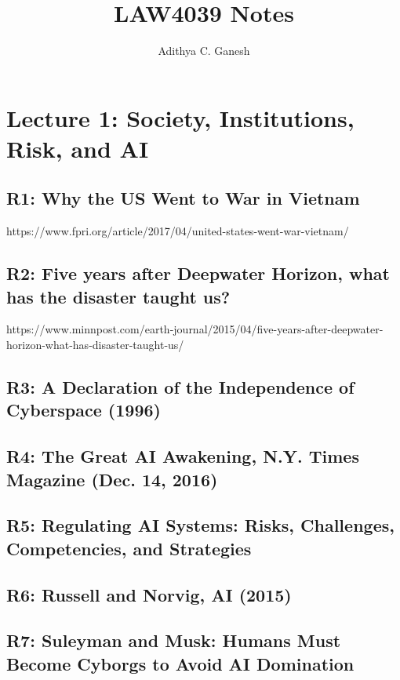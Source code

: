 \documentclass{article}
\title{LAW4039 Notes}
\author{Adithya C. Ganesh}
\begin{document}
\maketitle

\tableofcontents

\newpage

\section{Lecture 1: Society, Institutions, Risk, and AI}

\subsection{R1: Why the US Went to War in Vietnam}

https://www.fpri.org/article/2017/04/united-states-went-war-vietnam/

\subsection{R2: Five years after Deepwater Horizon, what has the disaster taught us?}

https://www.minnpost.com/earth-journal/2015/04/five-years-after-deepwater-horizon-what-has-disaster-taught-us/

\subsection{R3: A Declaration of the Independence of Cyberspace (1996)}

\subsection{R4: The Great AI Awakening, N.Y. Times Magazine (Dec. 14, 2016)}

\subsection{R5: Regulating AI Systems: Risks, Challenges, Competencies, and Strategies}

\subsection{R6: Russell and Norvig, AI (2015)}

\subsection{R7: Suleyman and Musk: Humans Must Become Cyborgs to Avoid AI Domination}
\end{document}
